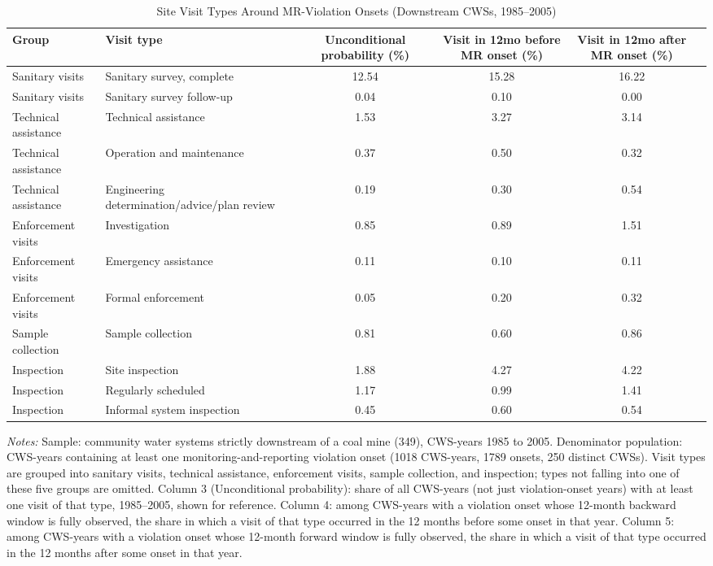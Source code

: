 \begin{table}[htbp]
\caption{\label{tab:visit_type_summary} Site Visit Types Around MR-Violation Onsets (Downstream CWSs, 1985--2005)}
\bigskip
\centering
\begin{adjustbox}{width = \textwidth, center}
\begin{tabular}{llcccc}
\toprule
Group & Visit type & Unconditional probability (\%) & Visit in 12mo before MR onset (\%) & Visit in 12mo after MR onset (\%) \\
\midrule
Sanitary visits & Sanitary survey, complete & 12.54 & 15.28 & 16.22 \\
Sanitary visits & Sanitary survey follow-up & 0.04 & 0.10 & 0.00 \\
Technical assistance & Technical assistance & 1.53 & 3.27 & 3.14 \\
Technical assistance & Operation and maintenance & 0.37 & 0.50 & 0.32 \\
Technical assistance & Engineering determination/advice/plan review & 0.19 & 0.30 & 0.54 \\
Enforcement visits & Investigation & 0.85 & 0.89 & 1.51 \\
Enforcement visits & Emergency assistance & 0.11 & 0.10 & 0.11 \\
Enforcement visits & Formal enforcement & 0.05 & 0.20 & 0.32 \\
Sample collection & Sample collection & 0.81 & 0.60 & 0.86 \\
Inspection & Site inspection & 1.88 & 4.27 & 4.22 \\
Inspection & Regularly scheduled & 1.17 & 0.99 & 1.41 \\
Inspection & Informal system inspection & 0.45 & 0.60 & 0.54 \\
\bottomrule
\end{tabular}
\end{adjustbox}
{\tiny\linespread{1}\selectfont \par \raggedright 
\textit{Notes:} Sample: community water systems strictly downstream of a coal mine (349), CWS-years 1985 to 2005. Denominator population: CWS-years containing at least one monitoring-and-reporting violation onset (1018 CWS-years, 1789 onsets, 250 distinct CWSs). Visit types are grouped into sanitary visits, technical assistance, enforcement visits, sample collection, and inspection; types not falling into one of these five groups are omitted. Column 3 (Unconditional probability): share of all CWS-years (not just violation-onset years) with at least one visit of that type, 1985--2005, shown for reference. Column 4: among CWS-years with a violation onset whose 12-month backward window is fully observed, the share in which a visit of that type occurred in the 12 months before some onset in that year. Column 5: among CWS-years with a violation onset whose 12-month forward window is fully observed, the share in which a visit of that type occurred in the 12 months after some onset in that year.
}
\end{table}

